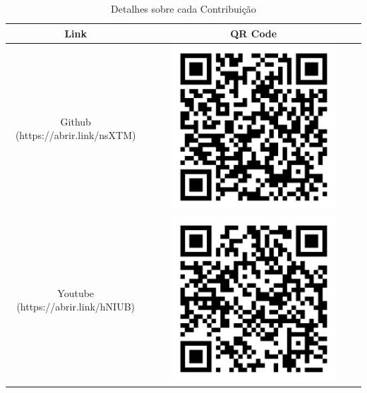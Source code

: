 \documentclass[12pt]{article}
\begin{document}
\begin{table}[ht]
\centering
\caption{Detalhes sobre cada Contribuição}
\label{tab:contribuicoes}
\begin{tabular}{ |c|c| } 
 \hline
 \textbf{Link} & \textbf{QR Code} \\ 
 \hline
 Github (https://abrir.link/nsXTM) & 
 \begin{minipage}{.3\textwidth}
    \centering
    \includegraphics[width=0.8\textwidth]{github.jpg}
 \end{minipage}
 \\ 
 \hline
 Youtube (https://abrir.link/hNIUB) & 
 \begin{minipage}{.3\textwidth}
    \centering
    \includegraphics[width=0.8\textwidth]{youtube.jpg}

\end{minipage}
\end{tabular}
\end{table}
\end{document}
